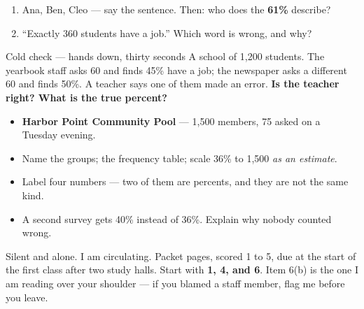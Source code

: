 \documentclass[aspectratio=169, 11pt]{beamer}
\begin{document}
\begin{frame}[t, plain]
  \vspace{4pt}
  \begin{enumerate}\setlength{\itemsep}{5pt}
    \item Ana, Ben, Cleo --- say the sentence. Then: who does the \textbf{61\%} describe?
    \item ``Exactly 360 students have a job.'' Which word is wrong, and why?
  \end{enumerate}
  \vspace{6pt}
  \begin{block}{Cold check --- hands down, thirty seconds}
    A school of 1{,}200 students. The yearbook staff asks 60 and finds 45\% have a job; the
    newspaper asks a different 60 and finds 50\%. A teacher says one of them made an error.
    \textbf{Is the teacher right? What is the true percent?}
  \end{block}
\end{frame}

\begin{frame}[t, plain]
  \begin{itemize}\setlength{\itemsep}{5pt}
    \item \textbf{Harbor Point Community Pool} --- 1{,}500 members, 75 asked on a Tuesday evening.
    \item Name the groups; the frequency table; scale 36\% to 1{,}500 \emph{as an estimate}.
    \item Label four numbers --- two of them are percents, and they are not the same kind.
    \item A second survey gets 40\% instead of 36\%. Explain why nobody counted wrong.
  \end{itemize}
  \begin{block}{Silent and alone. I am circulating. Packet pages, scored 1 to 5, due at the start of the first class after two study halls.}
    Start with \textbf{1, 4, and 6}. Item 6(b) is the one I am reading over your shoulder ---
    if you blamed a staff member, flag me before you leave.
  \end{block}
\end{frame}
\end{document}
